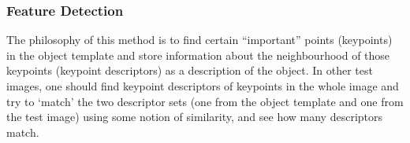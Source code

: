 \subsubsection{Feature Detection}

The philosophy of this method is to find certain ``important'' points (keypoints) in the object template and store information about the neighbourhood of those keypoints (keypoint descriptors) as a description of the object. In other test images, one should find keypoint descriptors of keypoints in the whole image and try to `match' the two descriptor sets (one from the object template and one from the test image) using some notion of similarity, and see how many descriptors match.



